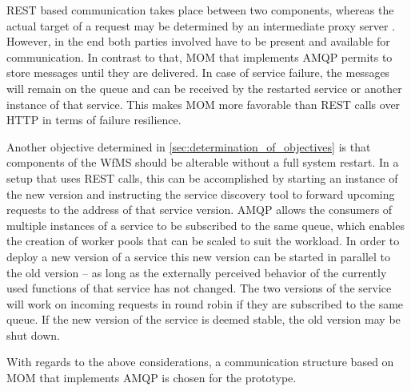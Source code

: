   \ac{REST} based communication takes place between two components, whereas the actual target of a request may be determined by an intermediate proxy server \cite[p.~6]{Fielding2002Principled}. However, in the end both parties involved have to be present and available for communication.
  In contrast to that, \ac{MOM} that implements \ac{AMQP} permits to store messages until they are delivered. In case of service failure, the messages will remain on the queue and can be received by the restarted service or another instance of that service. This makes \ac{MOM} more favorable than \ac{REST} calls over \ac{HTTP} in terms of failure resilience.

  Another objective determined in \ref{sec:determination_of_objectives} is that components of the \ac{WfMS} should be alterable without a full system restart.
  In a setup that uses \ac{REST} calls, this can be accomplished by starting an instance of the new version and instructing the service discovery tool to forward upcoming requests to the address of that service version.
  \ac{AMQP} allows the consumers of multiple instances of a service to be subscribed to the same queue, which enables the creation of worker pools that can be scaled to suit the workload.
  In order to deploy a new version of a service this new version can be started in parallel to the old version -- as long as the externally perceived behavior of the currently used functions of that service has not changed. The two versions of the service will work on incoming requests in round robin if they are subscribed to the same queue. If the new version of the service is deemed stable, the old version may be shut down.

  With regards to the above considerations, a communication structure based on \ac{MOM} that implements \ac{AMQP} is chosen for the prototype.

